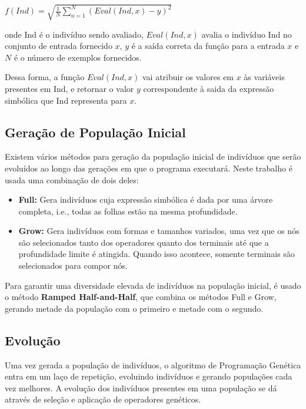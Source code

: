 \documentclass[12pt]{article}
\begin{document}
\begin{center}
 \begin{math}
  f(Ind) = \sqrt{\frac{1}{N}\sum_{n=1}^{N}(Eval(Ind, x) - y)^2}
  \end{math}
\end{center}

onde Ind é o indivíduo sendo avaliado, $ Eval(Ind, x) $ avalia o indivíduo Ind
no conjunto de entrada fornecido $ x $, $ y $ é a saída correta da função para 
a entrada $ x $ e $ N $ é o número de exemplos fornecidos.

Dessa forma, a função $ Eval(Ind, x) $ vai atribuir os valores em $ x $ às
variáveis presentes em Ind, e retornar o valor $ y $ correspondente à saida
da expressão simbólica que Ind representa para $ x $.

\subsection{Geração de População Inicial}

Existem vários métodos para geração da população inicial de indivíduos que serão
evoluídos ao longo das gerações em que o programa executará. Neste trabalho é usada
uma combinação de dois deles:

\begin{itemize}
 \item \textbf{Full:} Gera indivíduos cuja expressão simbólica é dada por uma árvore
 completa, i.e., todas as folhas estão na mesma profundidade.
 \item \textbf{Grow:} Gera indivíduos com formas e tamanhos variados, uma vez que
 os nós são selecionados tanto dos operadores quanto dos terminais até que a profundidade
 limite é atingida. Quando isso acontece, somente terminais são selecionados para compor
 nós.
\end{itemize}

Para garantir uma diversidade elevada de indivíduos na população inicial, é usado o
método \textbf{Ramped Half-and-Half}, que combina os métodos Full e Grow, gerando
metade da população com o primeiro e metade com o segundo.

\subsection{Evolução}

Uma vez gerada a população de indivíduos, o algoritmo de Programação Genética entra
em um laço de repetição, evoluindo indivíduos e gerando populações cada vez melhores.
A evolução dos indivíduos presentes em uma população se dá através de seleção e aplicação
de operadores genéticos.
\end{document}
